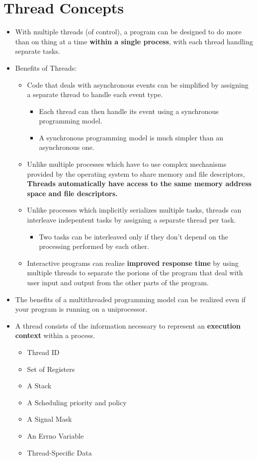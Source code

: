 \documentclass{article}
\begin{document}
\section{Thread Concepts}
\begin{itemize}
    \item With multiple threads (of control), a program can be designed to do more than on thing at a time \textbf{within a single process}, with each thread handling separate tasks.

    \item Benefits of Threads:
\begin{itemize}
    \item Code that deals with asynchronous events can be simplified by assigning a separate thread to handle each event type.
        \begin{itemize}
            \item Each thread can then handle its event using a synchronous programming model.
            \item A synchronous programming model is much simpler than an asynchronous one.
        \end{itemize}
    \item Unlike multiple processes which have to use complex mechanisms provided by the operating system to share memory and file descriptors, \textbf{Threads automatically have access to the same memory address space and file descriptors.}
    \item Unlike processes which implicitly serializes multiple tasks, threads can interleave indepentent tasks by assigning a separate thread per task.
        \begin{itemize}
            \item Two tasks can be interleaved only if they don't depend on the processing performed by each other.
        \end{itemize}
    \item Interactive programs can realize \textbf{improved response time} by using multiple threads to separate the porions of the program that deal with user input and output from the other parts of the program.
\end{itemize}

\item The benefits of a multithreaded programming model can be realized even if your program is running on a uniprocessor.

\item A thread consists of the information necessary to represent an \textbf{execution context} within a process.
    \begin{itemize}
        \item Thread ID
        \item Set of Registers
        \item A Stack
        \item A Scheduling priority and policy
        \item A Signal Mask
        \item An Errno Variable
        \item Thread-Specific Data
    \end{itemize}


\end{itemize}
\end{document}
